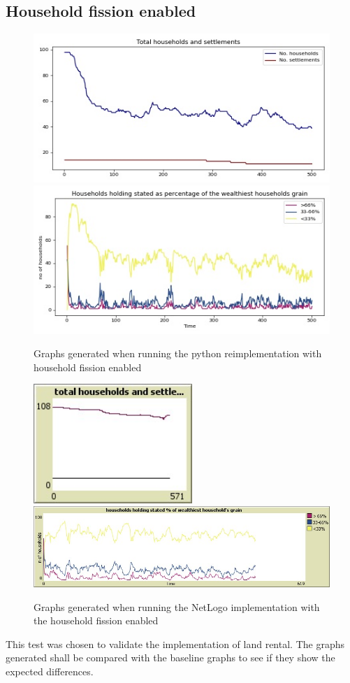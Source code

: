 \documentclass[12pt]{article}
\begin{document}
			\subsection{Household fission enabled}
				\begin{figure}[!htb]
					\includegraphics[width=12cm]{Fission_run1_A}\\
					\includegraphics[width=12cm]{Fission_run1_B}
					\caption{Graphs generated when running the python reimplementation with household fission enabled}
					\label{fig:Fission_enabled_ours_1}
				\end{figure}
				
				\begin{figure}[!htb]
					\includegraphics[width=6cm]{Fission_run1_C}\\
					\includegraphics[width=15cm]{Fission_run1_D}
					\caption{Graphs generated when running the NetLogo implementation with the household fission enabled}
					\label{fig:Fission_enabled_Netlogo_1}
				\end{figure}
				This test was chosen to validate the implementation of land rental. The graphs generated shall be compared with the baseline graphs to see if they show the expected differences.
			
\end{document}
